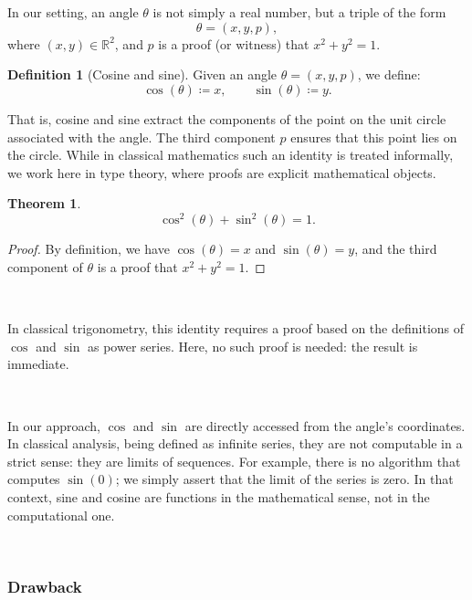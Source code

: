 \documentclass[11pt]{article}
\newtheorem{theorem}{Theorem}
\theoremstyle{definition}
\newtheorem{definition}{Definition}[section]
\begin{document}
\

\

\noindent In our setting, an angle \( \theta \) is not simply a real
number, but a triple of the form
\[
\theta = (x, y, p),
\]
where \( (x, y) \in \mathbb{R}^2 \), and \( p \) is a proof (or
witness) that \( x^2 + y^2 = 1 \).

\begin{definition}[Cosine and sine]
Given an angle \( \theta = (x, y, p) \), we define:
\[
\cos(\theta) \coloneqq x, \qquad \sin(\theta) \coloneqq y.
\]
\end{definition}

\noindent That is, cosine and sine extract the components of the point
on the unit circle associated with the angle. The third component \( p
\) ensures that this point lies on the circle. While in classical
mathematics such an identity is treated informally, we work here in
type theory, where proofs are explicit mathematical objects.

\begin{theorem}
\[
\cos^2(\theta) + \sin^2(\theta) = 1.
\]
\end{theorem}

\begin{proof}
By definition, we have \( \cos(\theta) = x \) and \( \sin(\theta) = y
\), and the third component of \( \theta \) is a proof that \( x^2 +
y^2 = 1 \).
\end{proof}

\

\noindent In classical trigonometry, this identity requires a proof
based on the definitions of \( \cos \) and \( \sin \) as power
series. Here, no such proof is needed: the result is immediate.

\

\noindent In our approach, \( \cos \) and \( \sin \) are directly
accessed from the angle's coordinates. In classical analysis, being
defined as infinite series, they are not computable in a strict sense:
they are limits of sequences. For example, there is no algorithm that
computes \( \sin(0) \); we simply assert that the limit of the series
is zero. In that context, sine and cosine are functions in the
mathematical sense, not in the computational one.

\

\subsubsection*{Drawback}
\end{document}
